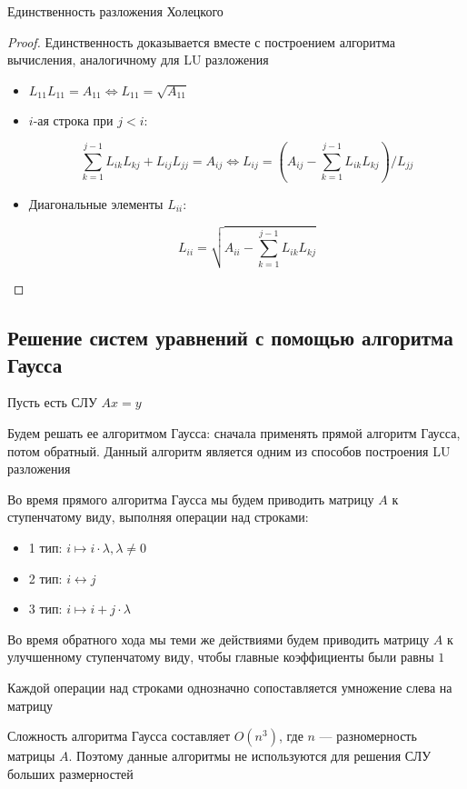 \begin{claim}
    Единственность разложения Холецкого
\end{claim}

\begin{proof}
    Единственность доказывается вместе с построением алгоритма вычисления, аналогичному для LU разложения

    \begin{itemize}
        \item $L_{11}L_{11} = A_{11} \iff L_{11} = \sqrt{A_{11}}$

        \item $i$-ая строка при $j < i$:

        \[
        \sum\limits_{k = 1}^{j - 1} L_{ik} L_{kj} + L_{ij}L_{jj} = A_{ij} \iff L_{ij} = \left(A_{ij} - \sum\limits_{k = 1}^{j - 1} L_{ik} L_{kj}\right) / L_{jj}
        \]

        \item Диагональные элементы $L_{ii}$:

        \[
        L_{ii} = \sqrt{A_{ii} - \sum\limits_{k = 1}^{j - 1} L_{ik} L_{kj}}
        \]
    \end{itemize}
\end{proof}

\subsection{Решение систем уравнений с помощью алгоритма Гаусса}

Пусть есть СЛУ $Ax = y$

Будем решать ее алгоритмом Гаусса: сначала применять прямой алгоритм
Гаусса, потом обратный. Данный алгоритм является одним из способов построения LU разложения

Во время прямого алгоритма Гаусса мы будем приводить матрицу $A$ к ступенчатому виду, выполняя операции над строками:

\begin{itemize}
    \item 1 тип: $i \mapsto i \cdot \lambda, \lambda \neq 0$
    \item 2 тип: $i \leftrightarrow j$
    \item 3 тип: $i \mapsto i + j \cdot \lambda$
\end{itemize}


Во время обратного хода мы теми же действиями будем приводить матрицу $A$ к улучшенному ступенчатому виду, чтобы главные коэффициенты были равны $1$

Каждой операции над строками однозначно сопоставляется умножение слева на матрицу

Сложность алгоритма Гаусса составляет $O(n^3)$, где $n$ --- разномерность матрицы $A$. Поэтому данные алгоритмы не используются для решения СЛУ больших размерностей

